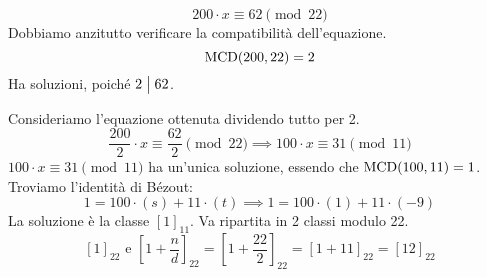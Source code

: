 \begin{exmp}
\[
200 \cdot x \equiv 62 \pmod{22}
\]
Dobbiamo anzitutto verificare la compatibilit\`a dell'equazione.
\[
\operatorname{MCD}(200, 22) = 2
\]
Ha soluzioni, poich\'e $2 \bigm| 62$.

Consideriamo l'equazione ottenuta dividendo tutto per 2.
\[
\frac{200}{2} \cdot x \equiv \frac{62}{2} \pmod{22} \implies 100 \cdot x \equiv 31 \pmod{11}
\]
$100 \cdot x \equiv 31 \pmod{11}$ ha un'unica soluzione, essendo che $\operatorname{MCD}(100, 11) = 1$. Troviamo l'identit\`a di B\'ezout:
\[
1 = 100 \cdot (s) + 11 \cdot (t) \implies 1 = 100 \cdot (1) + 11 \cdot (-9)
\]
La soluzione \`e la classe $[1]_{11}$. Va ripartita in 2 classi modulo 22.
\[
[1]_{22} \text{ e } \left[1 + \frac{n}{d} \right]_{22} = \left[1 + \frac{22}{2} \right]_{22} = [1 + 11]_{22} = [12]_{22}
\]
\end{exmp}






